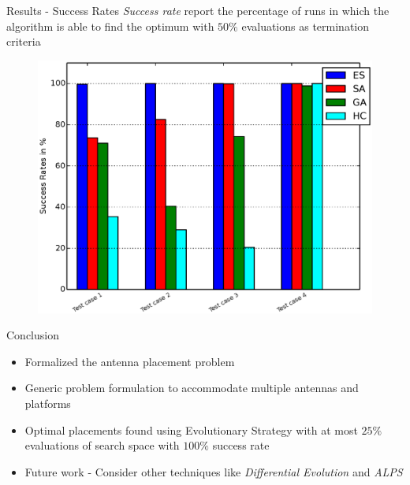 \documentclass{beamer}
\begin{document}
\begin{frame}{Results - Success Rates}
    \textit{Success rate} report the percentage of runs in which the algorithm is able to find the optimum with $50\%$ evaluations as termination criteria
    \begin{figure}
        \vspace*{-0.35cm}
        \centering
        \includegraphics[scale=0.4]{../paper/FIG/tc_sp}
    \end{figure}
\end{frame}

\begin{frame}{Conclusion}
\begin{itemize} \itemsep1.5em
        \item Formalized the antenna placement problem
        \item Generic problem formulation to accommodate multiple antennas and platforms
        \item Optimal placements found using Evolutionary Strategy with at most $25\%$ evaluations of search space with $100\%$ success rate
        \item Future work - Consider other techniques like \textit{Differential Evolution} and \textit{ALPS}
    \end{itemize}
\end{frame}
\end{document}
